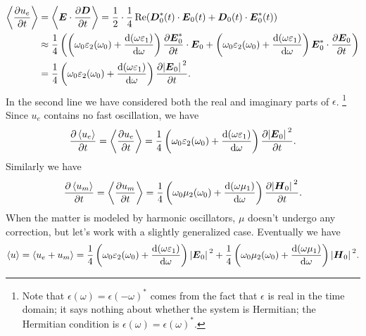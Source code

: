\documentclass[hyperref, a4paper]{article}
\begin{document}
\begin{equation}
    \begin{aligned}
        \expval{\pdv{u_e}{t}} &= \expval{\vb*{E} \cdot \pdv{\vb*{D}}{t}}
        = \frac{1}{2} \cdot \frac{1}{4} \Re (
            \vb*{D}_0^*(t) \cdot \vb*{E}_0(t)
            + \vb*{D}_0(t) \cdot \vb*{E}_0^*(t)
        ) \\
        &\approx \frac{1}{4} \left(
            \left(
                \omega_0 \varepsilon_2(\omega_0) 
                + \dv{(\omega \varepsilon_1)}{\omega} 
            \right)
                \pdv{\vb*{E}_0^*}{t} \cdot \vb*{E}_0 
            + \left(
                \omega_0 \varepsilon_2(\omega_0)
                + \dv{(\omega \varepsilon_1)}{\omega} 
            \right)
            \vb*{E}_0^* \cdot \pdv{\vb*{E}_0}{t} 
        \right) \\
        &= \frac{1}{4} \left(
            \omega_0 \varepsilon_2(\omega_0) +
            \dv{(\omega \varepsilon_1)}{\omega}
        \right) \pdv{\abs*{\vb*{E}_0}^2}{t} .
    \end{aligned}
\end{equation}
In the second line we have considered 
both the real and imaginary parts of $\epsilon$.%
\footnote{
    Note that $\epsilon(\omega) = \epsilon(- \omega)^*$
    comes from the fact that $\epsilon$ is real in the time domain;
    it says nothing about whether the system is Hermitian;
    the Hermitian condition is $\epsilon(\omega) = \epsilon(\omega)^*$.
} 
Since $u_e$ contains no fast oscillation, we have 
\begin{equation}
    \pdv{\expval{u_e}}{t} = \expval{\pdv{u_e}{t}} 
    = \frac{1}{4} \left(
        \omega_0 \varepsilon_2(\omega_0) +
        \dv{(\omega \varepsilon_1)}{\omega}
    \right)  
    \pdv{\abs*{\vb*{E}_0}^2}{t} .
\end{equation}
Similarly we have 
\begin{equation}
    \pdv{\expval{u_m}}{t} = \expval{\pdv{u_m}{t}} 
    = \frac{1}{4} \left(
        \omega_0 \mu_2(\omega_0) +
        \dv{(\omega \mu_1)}{\omega}
    \right) 
    \pdv{\abs*{\vb*{H}_0}^2}{t} .
\end{equation}
When the matter is modeled by harmonic oscillators, 
$\mu$ doesn't undergo any correction, 
but let's work with a slightly generalized case.
Eventually we have 
\begin{equation}
    \expval{u} = \expval{u_e + u_m} 
    = \frac{1}{4} \left(
        \omega_0 \varepsilon_2(\omega_0) +
        \dv{(\omega \varepsilon_1)}{\omega}
    \right)  
    \abs*{\vb*{E}_0}^2 + 
    \frac{1}{4} \left(
        \omega_0 \mu_2(\omega_0) +
        \dv{(\omega \mu_1)}{\omega}
    \right) 
    \abs*{\vb*{H}_0}^2.
\end{equation}
\end{document}
